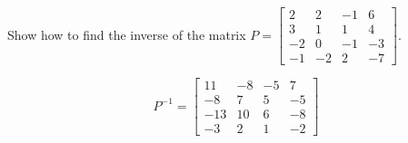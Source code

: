 
\begin{exerciseStatement}


Show how to find the inverse of the matrix \(P= \left[\begin{array}{cccc}
2 & 2 & -1 & 6 \\
3 & 1 & 1 & 4 \\
-2 & 0 & -1 & -3 \\
-1 & -2 & 2 & -7
\end{array}\right] \).


\end{exerciseStatement}
    
\begin{exerciseAnswer} 
\[P^{-1}= \left[\begin{array}{cccc}
11 & -8 & -5 & 7 \\
-8 & 7 & 5 & -5 \\
-13 & 10 & 6 & -8 \\
-3 & 2 & 1 & -2
\end{array}\right] \]
\end{exerciseAnswer}
    
